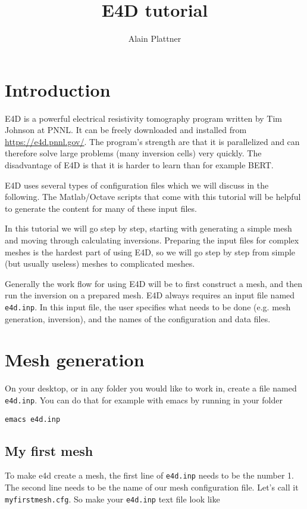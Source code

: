 \documentclass[11pt]{article}
\title{E4D tutorial}
\author{Alain Plattner}
\begin{document}
\maketitle

\section{Introduction}
E4D is a powerful electrical resistivity tomography program written by
Tim Johnson at PNNL. It can be freely downloaded and installed from
\url{https://e4d.pnnl.gov/}. The program's strength are that it is
parallelized and can therefore solve large problems (many inversion
cells) very quickly. The disadvantage of E4D is that it is harder to
learn than for example BERT.

E4D uses several types of configuration files which we will discuss in the
following. The Matlab/Octave scripts that come with this tutorial will
be helpful to generate the content for many of these input files.

In this tutorial we will go step by step, starting with generating a
simple mesh and moving through calculating inversions. Preparing the
input files for complex meshes is the hardest part of using E4D, so we
will go step by step from simple (but usually useless) meshes to
complicated meshes.

Generally the work flow for using E4D will be to first construct a
mesh, and then run the inversion on a prepared mesh. E4D always
requires an input file named \verb+e4d.inp+. In this input file, the
user specifies what needs to be done (e.g. mesh generation,
inversion), and the names of the configuration and data files.


\section{Mesh generation}\label{meshsec}
On your desktop, or in any folder you would like to work in, create a
file named \verb+e4d.inp+. You can do that for example with emacs by
running in your folder

\qquad \verb+emacs e4d.inp+ 


\subsection{My first mesh}\label{simplemesh}

To make e4d create a mesh, the first line of \verb+e4d.inp+ needs to
be the number 1. The second line needs to be the name of our mesh
configuration file. Let's call it \verb+myfirstmesh.cfg+. So make your
\verb+e4d.inp+ text file look like
\end{document}
